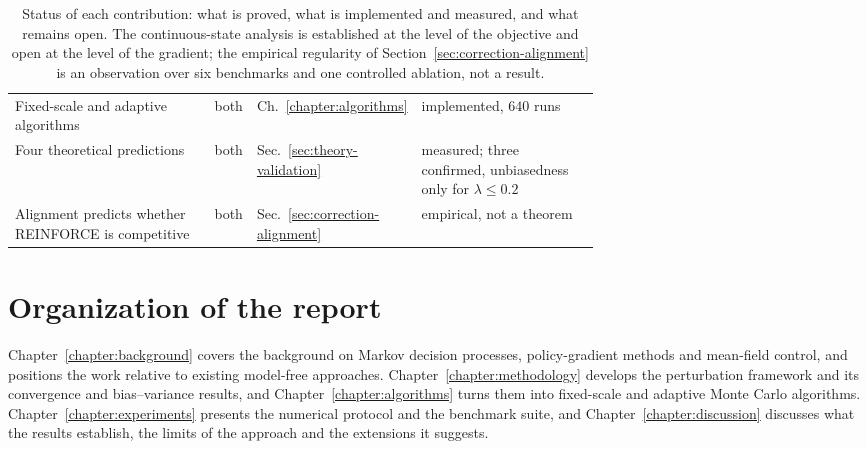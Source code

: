 \begin{table}[H]
\begin{tabular}{p{0.36\linewidth}llp{0.32\linewidth}}
\midrule
Fixed-scale and adaptive algorithms & both & Ch.~\ref{chapter:algorithms} & implemented, $640$ runs \\
Four theoretical predictions & both & Sec.~\ref{sec:theory-validation} & measured; three confirmed, unbiasedness only for $\lambda\leq0.2$ \\
Alignment predicts whether REINFORCE is competitive & both & Sec.~\ref{sec:correction-alignment} & empirical, not a theorem \\
\bottomrule
\end{tabular}
\caption{Status of each contribution: what is proved, what is implemented and measured, and what remains open. The continuous-state analysis is established at the level of the objective and open at the level of the gradient; the empirical regularity of Section~\ref{sec:correction-alignment} is an observation over six benchmarks and one controlled ablation, not a result.}
\label{tab:contribution-status}
\end{table}

\section{Organization of the report}

Chapter~\ref{chapter:background} covers the background on Markov decision processes, policy-gradient methods and mean-field control, and positions the work relative to existing model-free approaches. Chapter~\ref{chapter:methodology} develops the perturbation framework and its convergence and bias--variance results, and Chapter~\ref{chapter:algorithms} turns them into fixed-scale and adaptive Monte Carlo algorithms. Chapter~\ref{chapter:experiments} presents the numerical protocol and the benchmark suite, and Chapter~\ref{chapter:discussion} discusses what the results establish, the limits of the approach and the extensions it suggests.

